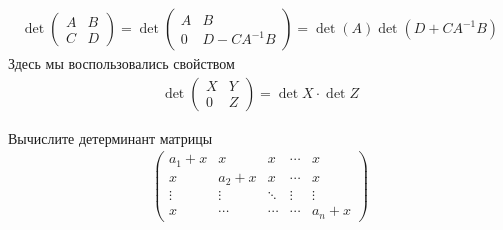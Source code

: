 \begin{sol}
    \begin{gather*}
        \det \left(
        \begin{array}{cc}
           A &  B \\
           C &  D 
        \end{array}\right) =
        \det
         \left(
        \begin{array}{cc}
           A &  B \\
           0 &  D - C A^{-1}B
        \end{array}\right) = \det (A) \det (D +  C A^{-1} B)
    \end{gather*}
    Здесь мы воспользовались свойством
    \begin{gather*}
        \det \left(
        \begin{array}{cc}
           X &  Y \\
           0 &  Z 
        \end{array}\right) = \det X \cdot \det Z
    \end{gather*}
\end{sol}

\begin{prb}
Вычислите детерминант матрицы
    \begin{gather*}
        \left(
        \begin{array}{ccccc}
           a_{1} + x & x & x & \cdots & x\\
           x  &  a_{2} + x & x & \cdots & x\\
           \vdots & \vdots & \ddots& \vdots & \vdots\\
           x & \cdots & \cdots & \cdots & a_{n} + x
        \end{array}
        \right)
    \end{gather*}
\end{prb}


